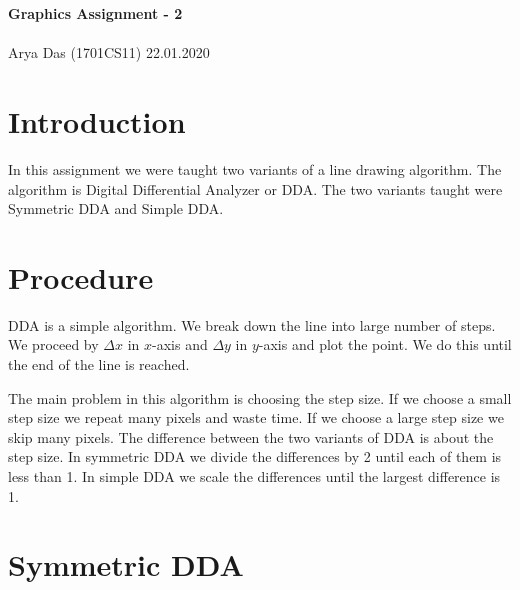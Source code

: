\documentclass[a4paper, 11pt]{article}
\begin{document}
\noindent
{\Huge\textbf{Graphics Assignment - 2}} \\ \\
\Large Arya Das (1701CS11) \hfill 22.01.2020\\

\section*{Introduction}
In this assignment we were taught two variants of a line drawing algorithm. The algorithm is Digital Differential Analyzer or DDA. The two variants taught were Symmetric DDA and Simple DDA.

\section*{Procedure}
DDA is a simple algorithm. We break down the line into large number of steps. We proceed by $\Delta x$ in $x$-axis and $\Delta y$ in $y$-axis and plot the point. We do this until the end of the line is reached.

The main problem in this algorithm is choosing the step size. If we choose a small step size we repeat many pixels and waste time. If we choose a large step size we skip many pixels. The difference between the two variants of DDA is about the step size. In symmetric DDA we divide the differences by 2 until each of them is less than 1. In simple DDA we scale the differences until the largest difference is 1.

\section*{Symmetric DDA}
\end{document}
